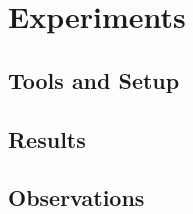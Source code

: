 \section{Experiments}
\label{ch:experiments}



\subsection{Tools and Setup}


\subsection{Results}


\subsection{Observations}

